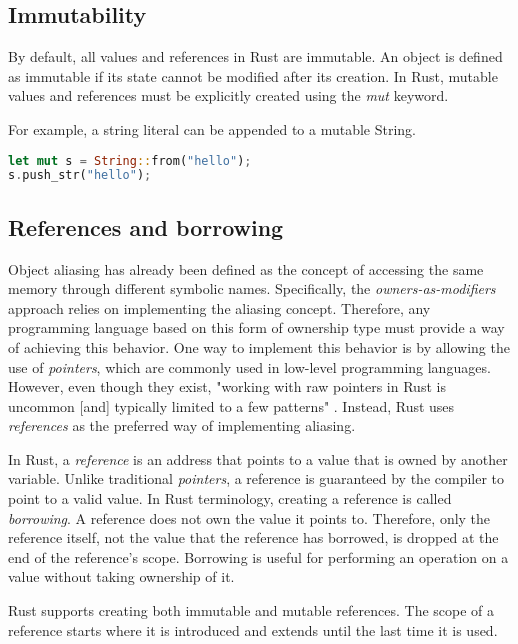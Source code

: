 \documentclass[sigplan,11pt,nonacm]{acmart}
\begin{document}
\subsection{Immutability}
\label{sec:rust-immutability}

By default, all values and references in Rust are immutable.
An object is defined as immutable if its state cannot be modified after its creation.
In Rust, mutable values and references must be explicitly created using the \emph{mut} keyword.

For example, a string literal can be appended to a mutable String.
\begin{lstlisting}[language=Rust]
let mut s = String::from("hello");
s.push_str("hello");
\end{lstlisting}


\subsection{References and borrowing}
\label{sec:rust-references}

Object aliasing has already been defined as the concept of accessing the same memory through different symbolic names.
Specifically, the \emph{owners-as-modifiers} approach relies on implementing the aliasing concept.
Therefore, any programming language based on this form of ownership type must provide a way of achieving this behavior.
One way to implement this behavior is by allowing the use of \emph{pointers}, which are commonly used in low-level programming languages.
However, even though they exist, "working with raw pointers in Rust is uncommon [and] typically limited to a few patterns" \cite{rust-pointer-documentation}.
Instead, Rust uses \emph{references} as the preferred way of implementing aliasing.

In Rust, a \emph{reference} is an address that points to a value that is owned by another variable.
Unlike traditional \emph{pointers}, a reference is guaranteed by the compiler to point to a valid value.
In Rust terminology, creating a reference is called \emph{borrowing}.
A reference does not own the value it points to.
Therefore, only the reference itself, not the value that the reference has borrowed, is dropped at the end of the reference's scope.
Borrowing is useful for performing an operation on a value without taking ownership of it.

Rust supports creating both immutable and mutable references.
The scope of a reference starts where it is introduced and extends until the last time it is used.
\end{document}
